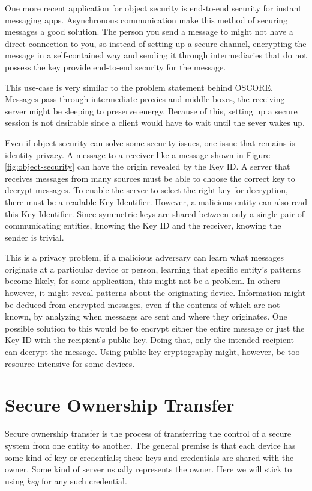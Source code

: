 One more recent application for object security is end-to-end security for instant messaging apps. Asynchronous communication make this method of securing messages a good solution. The person you send a message to might not have a direct connection to you, so instead of setting up a secure channel, encrypting the message in a self-contained way and sending it through intermediaries that do not possess the key provide end-to-end security for the message. 

This use-case is very similar to the problem statement behind OSCORE. Messages pass through intermediate proxies and middle-boxes, the receiving server might be sleeping to preserve energy. Because of this, setting up a secure session is not desirable since a client would have to wait until the sever wakes up.  

Even if object security can solve some security issues, one issue that remains is identity privacy. A message to a receiver like a message shown in Figure \ref{fig:object-security} can have the origin revealed by the Key ID. A server that receives messages from many sources must be able to choose the correct key to decrypt messages. To enable the server to select the right key for decryption, there must be a readable Key Identifier. However, a malicious entity can also read this Key Identifier. Since symmetric keys are shared between only a single pair of communicating entities, knowing the Key ID and the receiver, knowing the sender is trivial. 

This is a privacy problem, if a malicious adversary can learn what messages originate at a particular device or person, learning that specific entity's patterns become likely, for some application, this might not be a problem. In others however, it might reveal patterns about the originating device. Information might be deduced from encrypted messages, even if the contents of which are not known, by analyzing when messages are sent and where they originates. One possible solution to this would be to encrypt either the entire message or just the Key ID with the recipient's public key. Doing that, only the intended recipient can decrypt the message. Using public-key cryptography might, however, be too resource-intensive for some devices.

\section{Secure Ownership Transfer}
\label{sec:ot}
Secure ownership transfer is the process of transferring the control of a secure system from one entity to another. The general premise is that each device has some kind of key or credentials; these keys and credentials are shared with the owner. Some kind of server usually represents the owner. Here we will stick to using \emph{key} for any such credential.

